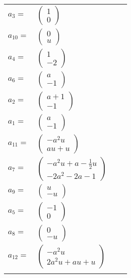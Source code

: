 \documentclass[1p]{elsarticle_modified}
\theoremstyle{definition}
\begin{document}
\begin{tabular}{m{7pt} m{180pt} m{7pt} m{180pt} }
\flushright $a_{3}=$&$\begin{pmatrix}1\\0\end{pmatrix}$ \\
\flushright $a_{10}=$&$\begin{pmatrix}0\\u\end{pmatrix}$ \\
\flushright $a_{4}=$&$\begin{pmatrix}1\\-2\end{pmatrix}$ \\
\flushright $a_{6}=$&$\begin{pmatrix}a\\-1\end{pmatrix}$ \\
\flushright $a_{2}=$&$\begin{pmatrix}a+1\\-1\end{pmatrix}$ \\
\flushright $a_{1}=$&$\begin{pmatrix}a\\-1\end{pmatrix}$ \\
\flushright $a_{11}=$&$\begin{pmatrix}- a^2 u\\a u+u\end{pmatrix}$ \\
\flushright $a_{7}=$&$\begin{pmatrix}- a^2 u+a-\frac{1}{2} u\\-2 a^2-2 a-1\end{pmatrix}$ \\
\flushright $a_{9}=$&$\begin{pmatrix}u\\- u\end{pmatrix}$ \\
\flushright $a_{5}=$&$\begin{pmatrix}-1\\0\end{pmatrix}$ \\
\flushright $a_{8}=$&$\begin{pmatrix}0\\- u\end{pmatrix}$ \\
\flushright $a_{12}=$&$\begin{pmatrix}- a^2 u\\2 a^2 u+a u+u\end{pmatrix}$\\&\end{tabular}
\end{document}
